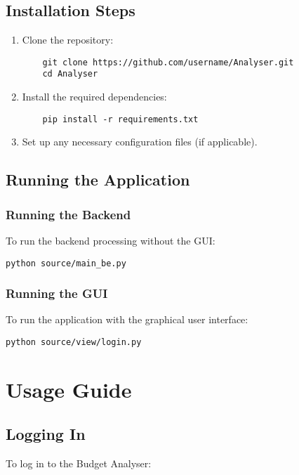 \documentclass[11pt,a4paper]{report}
\begin{document}
\section{Installation Steps}

\begin{enumerate}
    \item Clone the repository:
    \begin{lstlisting}
    git clone https://github.com/username/Analyser.git
    cd Analyser
    \end{lstlisting}
    
    \item Install the required dependencies:
    \begin{lstlisting}
    pip install -r requirements.txt
    \end{lstlisting}
    
    \item Set up any necessary configuration files (if applicable).
\end{enumerate}

\section{Running the Application}

\subsection{Running the Backend}
To run the backend processing without the GUI:

\begin{lstlisting}
python source/main_be.py
\end{lstlisting}

\subsection{Running the GUI}
To run the application with the graphical user interface:

\begin{lstlisting}
python source/view/login.py
\end{lstlisting}

\chapter{Usage Guide}

\section{Logging In}
To log in to the Budget Analyser:
\end{document}
